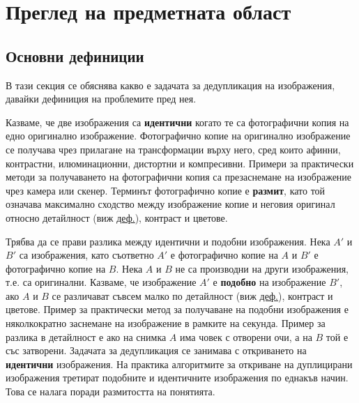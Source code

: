 \documentclass[a4paper,12pt]{article}
\begin{document}
\section{Преглед на предметната област}

\subsection{Основни дефиниции}

В тази секция се обяснява какво е задачата за дедупликация на изображения, давайки дефиниция на проблемите пред нея.

\bigbreak

Казваме, че две изображения са \textbf{идентични} когато те са фотографични копия на едно оригинално изображение. Фотографично копие на оригинално изображение се получава чрез прилагане на трансформации върху него, сред които афинни, контрастни, илюминационни, дистортни и компресивни. Примери за практически методи за получаването на фотографични копия са презаснемане на изображение чрез камера или скенер. Терминът фотографично копие е \textbf{размит}, като той означава максимално сходство между изображение копие и неговия оригинал относно детайлност (виж \hyperref[def:imdetail]{деф.}), контраст и цветове.

\bigbreak

Трябва да се прави разлика между идентични и подобни изображения. Нека $A'$ и $B'$ са изображения, като съответно $A'$ е фотографично копие на $A$ и $B'$ е фотографично копие на $B$. Нека $A$ и $B$ не са производни на други изображения, т.е. са оригинални. Казваме, че изображение $A'$ е \textbf{подобно} на изображение $B'$, ако $A$ и $B$ се различават съвсем малко по детайлност (виж \hyperref[def:imdetail]{деф.}), контраст и цветове. Пример за практически метод за получаване на подобни изображения е няколкократно заснемане на изображение в рамките на секунда. Пример за разлика в детайлност е ако на снимка $A$ има човек с отворени очи, а на $B$ той е със затворени. Задачата за дедупликация се занимава с откриването на \textbf{идентични} изображения. На практика алгоритмите за откриване на дуплицирани изображения третират подобните и идентичните изображения по еднакъв начин. Това се налага поради размитостта на понятията. 

\bigbreak
\end{document}
